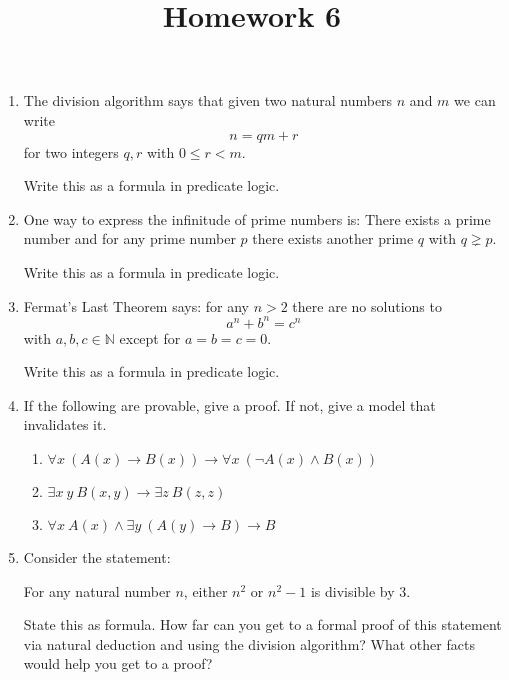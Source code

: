 \documentclass[12pt]{amsart}
\theoremstyle{definition}
\begin{document}
\title{Homework 6}

\maketitle

\begin{enumerate}
	\item The division algorithm says that given two natural numbers $n$ and $m$ we can write 
		\begin{displaymath}
			n = qm + r
		\end{displaymath}
		for two integers $q,r$ with $0 \leq r < m$. 

		Write this as a formula in predicate logic. 
	\item One way to express the infinitude of prime numbers is: There exists a prime number and 
		for any prime number $p$ there exists another prime $q$ with $q \gneq p$. 

		Write this as a formula in predicate logic. 
	\item Fermat's Last Theorem says: for any $n > 2$ there are no solutions to 
		\begin{displaymath}
			a^n + b^n = c^n 
		\end{displaymath}
		with $a,b,c \in \mathbb{N}$ except for $a=b=c=0$. 
		
		Write this as a formula in predicate logic. 
	\item If the following are provable, give a proof. If not, give a model that invalidates it. 
	\begin{enumerate}
		\item $\displaystyle{\forall x~ (A(x) \to B(x)) \to \forall x~ (\neg A(x) \land B(x))}$
		\item $\displaystyle{\exists x~y~ B(x,y) \to \exists z~ B(z,z)}$
		\item $\displaystyle{\forall x~ A(x) \land \exists y~ (A(y) \to B) \to B}$
	\end{enumerate}
	\item Consider the statement:
	\begin{center}
		For any natural number $n$, either $n^2$ or $n^2 - 1$ is divisible by $3$. 
	\end{center}
	State this as formula. How far can you get to a formal proof of this statement via 
	natural deduction and using the division algorithm? What other facts would help you 
	get to a proof?
\end{enumerate}
\end{document}
